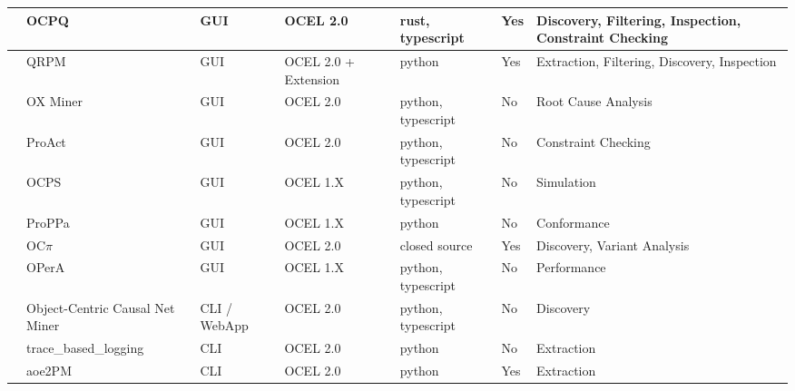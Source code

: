 \begin{table}
\begin{tabular}{|l|p{4cm}|l|p{2cm}|l|l|p{4.5cm}|}
		\cite{ocpq}               & OCPQ                             & GUI          & OCEL 2.0             & rust, typescript    & Yes         & Discovery,  Filtering, Inspection, Constraint Checking \\ \hline
		\cite{qrpm}               & QRPM                             & GUI          & OCEL 2.0 + Extension & python              & Yes         & Extraction, Filtering, Discovery, Inspection           \\ \hline
		\cite{oxminer}            & OX Miner                         & GUI          & OCEL 2.0             & python, typescript  & No          & Root Cause Analysis                                    \\ \hline
		\cite{proact}             & ProAct                           & GUI          & OCEL 2.0             & python, typescript  & No          & Constraint Checking                                    \\ \hline
		\cite{ocpsm}              & OCPS                             & GUI          & OCEL 1.X             & python, typescript  & No          & Simulation                                             \\ \hline
		\cite{propp}              & ProPPa                           & GUI          & OCEL 1.X             & python              & No          & Conformance                                            \\ \hline
		\cite{ocpi}               & OC$\pi$                          & GUI          & OCEL 2.0             & closed source       & Yes         & Discovery, Variant Analysis                            \\ \hline
		\cite{opera}              & OPerA                            & GUI          & OCEL 1.X             & python,  typescript & No          & Performance                                            \\ \hline
		\cite{occnet}             & Object-Centric Causal Net Miner  & CLI / WebApp & OCEL 2.0             & python,  typescript & No          & Discovery                                              \\ \hline
		\cite{ethereum}           & trace\_based\_logging            & CLI          & OCEL 2.0             & python              & No          & Extraction                                             \\ \hline
		\cite{aoe}                & aoe2PM                           & CLI          & OCEL 2.0             & python              & Yes         & Extraction                                             \\ \hline

\end{tabular}
\end{table}
